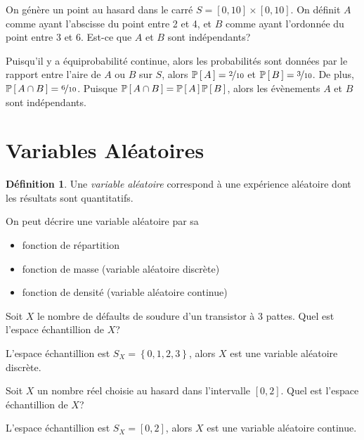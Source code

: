 \documentclass[11pt]{article}
\makeatletter
\renewcommand\P[1]{%
	\ensuremath{%
		\mathbb{P}\left[\,#1\,\right]%
	}%
}%
\theoremstyle{remark}
\theoremstyle{definition}
\newtheorem*{@definition}{Définition}
\newenvironment{definition}{%
	\begin{@definition}%
}{%
	\end{@definition}%
	\setcounter{property}{0}%
}
\makeatother
\begin{document}
\begin{exemple}
	On génère un point au hasard dans le carré $S=[0,10]\times[0,10]$. On
	définit $A$ comme ayant l'abscisse du point entre 2 et 4, et $B$ comme
	ayant l'ordonnée du point entre 3 et 6. Est-ce que $A$ et $B$ sont
	indépendants?
	\begin{figure}[H]
		\centering
		
	\end{figure}
\end{exemple}
\addtocounter{exemple}{-1}
\begin{exemple}[suite]
	Puisqu'il y a équiprobabilité continue, alors les probabilités sont données
	par le rapport entre l'aire de $A$ ou $B$ sur $S$, alors
	$\P{A}=\nicefrac{2}{10}$ et $\P{B}=\nicefrac{3}{10}$. De plus,
	$\P{A\cap B}=\nicefrac{6}{10}$. Puisque $\P{A\cap B}=\P{A}\P{B}$, alors les
	évènements $A$ et $B$ sont indépendants.
\end{exemple}

\section{Variables Aléatoires}
\begin{definition}
	Une \textit{variable aléatoire} correspond à une expérience aléatoire dont
	les résultats sont quantitatifs.
\end{definition}

On peut décrire une variable aléatoire par sa
\begin{itemize}
	\item fonction de répartition
	\item fonction de masse (variable aléatoire discrète)
	\item fonction de densité (variable aléatoire continue)
\end{itemize}

\begin{exemple}
	Soit $X$ le nombre de défaults de soudure d'un transistor à 3 pattes. Quel
	est l'espace échantillion de $X$?

	L'espace échantillion est $S_X=\left\{0,1,2,3\right\}$, alors $X$ est une
	variable aléatoire discrète.
\end{exemple}

\begin{exemple}
	Soit $X$ un nombre réel choisie au hasard dans l'intervalle $[0,2]$. Quel
	est l'espace échantillion de $X$?

	L'espace échantillion est $S_X=[0,2]$, alors $X$ est une variable aléatoire
	continue.
\end{exemple}
\end{document}
